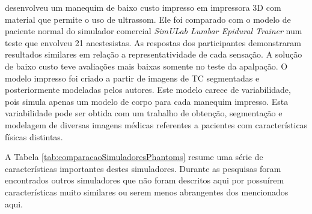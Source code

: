 \textcite{Mashari2018} desenvolveu um manequim de baixo custo impresso em impressora 3D com material que permite o uso de ultrassom. Ele foi comparado com o modelo de paciente normal do simulador comercial \textit{SimULab Lumbar Epidural Trainer} num teste que envolveu 21 anestesistas. As respostas dos participantes demonstraram resultados similares em relação a representatividade de cada sensação. A solução de baixo custo teve avaliações mais baixas somente no teste da apalpação. O modelo impresso foi criado a partir de imagens de \acrshort{TC} segmentadas e posteriormente modeladas pelos autores. Este modelo carece de variabilidade, pois simula apenas um modelo de corpo para cada manequim impresso. Esta variabilidade pode ser obtida com um trabalho de obtenção, segmentação e modelagem de diversas imagens médicas referentes a pacientes com características físicas distintas.

A Tabela \ref{tab:comparacaoSimuladoresPhantoms} resume uma série de características importantes destes simuladores. Durante as pesquisas foram encontrados outros simuladores que não foram descritos aqui por possuírem  características muito similares ou serem menos abrangentes dos mencionados aqui.

